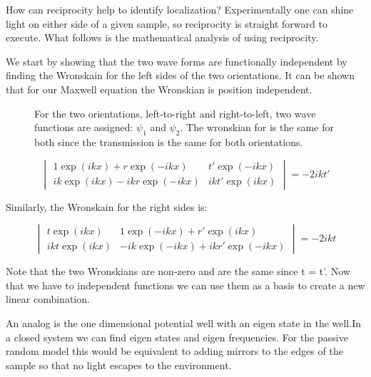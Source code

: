How can reciprocity help to identify localization? Experimentally one can shine light on either side of a given sample, so reciprocity is straight forward to execute.  What follows is	%
the mathematical analysis of using reciprocity.

We start by showing that the two wave forms are functionally independent by finding the Wronskain for the left sides of the two orientations. It can be shown that for our Maxwell equation the Wronskian is position independent.

\begin{figure}
\vskip -0.5cm
\centerline{
}
\vskip -0.5cm
\caption{For the two orientations, left-to-right and right-to-left, two wave functions are assigned: $ \psi _1$ and $ \psi _2$. The wronskian for is the same for both since the transmission is the same for both orientations.}
\label{fig:wronskainLRRL}
\end{figure}

\begin{equation}
\begin{vmatrix}
1 \exp(i k x) + r \exp(-i k x) & t' \exp(-i k x) \\
i k \exp(i k x) - i k r \exp(-i k x) & i k t' \exp(i k x)
\end{vmatrix}
 = -2 i k t'
\label{fig:wronskleft}
\end{equation}

Similarly, the Wronskain for the right sides is: %

\begin{equation}
\begin{vmatrix}
 t \exp(i k x) & 1 \exp(-i k x) + r' \exp(i k x)\\
i k t \exp(i k x) & -i k \exp(-i k x) + i k r' \exp(-i k x)
\end{vmatrix}
 = -2 i k t
 \label{fig:wronskright}
\end{equation}

Note that the two Wronskians are non-zero and are the same since t = t'. Now that we have to independent functions we can use them as a basis to create a new linear combination.

An analog is the one dimensional potential well with an eigen state in the well.In a closed system we can find eigen states and eigen frequencies.  For the passive random model this would be equivalent to adding mirrors to the edges of the sample so that no light escapes to the environment.

